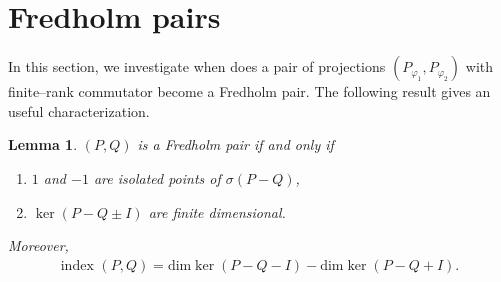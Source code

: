 \documentclass[12pt, a4 paper]{amsart}
\theoremstyle{definition}
\theoremstyle{plain}
\newtheorem{lem}[thm]{Lemma}
\theoremstyle{definition}
\numberwithin{equation}{section}
\let\phi=\varphi
\begin{document}
\section{Fredholm pairs}\label{sec3}
In this section, we investigate when does a  pair of projections $(P_{\phi_1}, P_{\phi_2})$ with finite--rank commutator become a Fredholm pair. The following result \cite[Proposition 3.1]{ASS} gives an useful characterization.
\begin{lem}\label{B.Simon}
    $(P,Q)$ is a Fredholm pair if and only if 
    \begin{enumerate}
        \item $1$ and $-1$ are isolated points of $\sigma(P-Q)$,
        \item $\ker (P-Q\pm I)$ are finite dimensional.
    \end{enumerate}
    Moreover, \begin{align*}
        \text{index }(P,Q)=\text{dim}\ker (P-Q-I)-\text{dim}\ker (P-Q+I).
    \end{align*}
\end{lem}
\end{document}
